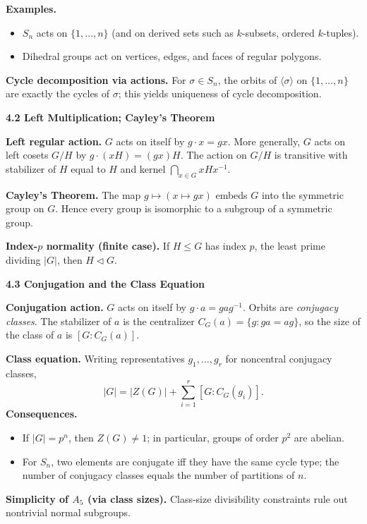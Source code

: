 \documentclass[11pt]{article}
\theoremstyle{definition}
\begin{document}
\medskip
\textbf{Examples.}
\begin{itemize}\itemsep3pt
\item $S_n$ acts on $\{1,\dots,n\}$ (and on derived sets such as $k$-subsets, ordered $k$-tuples).
\item Dihedral groups act on vertices, edges, and faces of regular polygons.
\end{itemize}

\medskip
\textbf{Cycle decomposition via actions.} For $\sigma\in S_n$, the orbits of $\langle\sigma\rangle$ on $\{1,\dots,n\}$ are exactly the cycles of $\sigma$; this yields uniqueness of cycle decomposition.

\newpage

\textbf{4.2 Left Multiplication; Cayley’s Theorem}

\medskip
\textbf{Left regular action.} $G$ acts on itself by $g\cdot x=gx$. More generally, $G$ acts on left cosets $G/H$ by $g\cdot (xH)=(gx)H$. The action on $G/H$ is transitive with stabilizer of $H$ equal to $H$ and kernel $\bigcap_{x\in G}xHx^{-1}$.

\medskip
\textbf{Cayley’s Theorem.} The map $g\mapsto (x\mapsto gx)$ embeds $G$ into the symmetric group on $G$. Hence every group is isomorphic to a subgroup of a symmetric group.

\medskip
\textbf{Index-$p$ normality (finite case).} If $H\le G$ has index $p$, the least prime dividing $|G|$, then $H\lhd G$.

\newpage

\textbf{4.3 Conjugation and the Class Equation}

\medskip
\textbf{Conjugation action.} $G$ acts on itself by $g\cdot a=gag^{-1}$. Orbits are \emph{conjugacy classes}. The stabilizer of $a$ is the centralizer $C_G(a)=\{g:ga=ag\}$, so the size of the class of $a$ is $[G:C_G(a)]$.

\medskip
\textbf{Class equation.} Writing representatives $g_1,\dots,g_r$ for noncentral conjugacy classes,
\[
|G|=|Z(G)|+\sum_{i=1}^r [G:C_G(g_i)].
\]
\textbf{Consequences.}
\begin{itemize}\itemsep3pt
\item If $|G|=p^n$, then $Z(G)\neq 1$; in particular, groups of order $p^2$ are abelian.
\item For $S_n$, two elements are conjugate iff they have the same cycle type; the number of conjugacy classes equals the number of partitions of $n$.
\end{itemize}

\medskip
\textbf{Simplicity of $A_5$ (via class sizes).} Class-size divisibility constraints rule out nontrivial normal subgroups.
\end{document}
